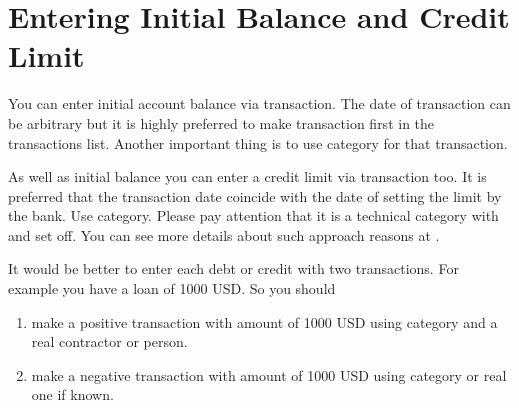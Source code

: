 \documentclass[a4paper,10pt,english]{sphinxmanual}
\begin{document}
\section{Entering Initial Balance and Credit Limit}
\label{\detokenize{getting-started:entering-initial-balance-and-credit-limit}}
You can enter initial account balance via transaction. The date of transaction can be arbitrary but it is
highly preferred to make transaction first in the transactions list.
Another important thing is to use category  for that transaction.

\noindent{}

\noindent{}

As well as initial balance you can enter a credit limit via transaction too. It is preferred that the transaction date coincide with the date of setting the limit by the bank.
Use  category. Please pay attention that it is a technical category with
 and  set off. You can see more details about such approach reasons
at .

\noindent{}

\noindent{}

It would be better to enter each debt or credit with two transactions. For example you have a loan of 1000 USD. So you should
\begin{enumerate}
\def\theenumi{\arabic{enumi}}
\def\labelenumi{\theenumi .}
\makeatletter\def\p@enumii{\p@enumi \theenumi .}\makeatother
\item {} 
make a positive transaction with amount of 1000 USD using category  and a real contractor or person.

\item {} 
make a negative transaction with amount of 1000 USD using category  or real one if known.

\end{enumerate}
\end{document}
